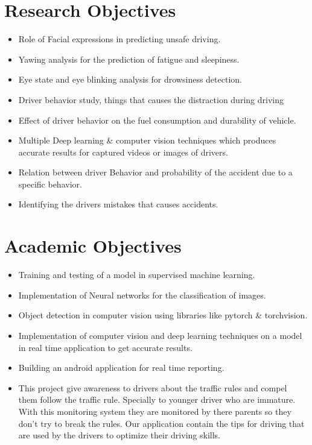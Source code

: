 \section{Research Objectives}
\begin{itemize}
    \item Role of Facial expressions in predicting unsafe driving.
    \item Yawing analysis for the prediction of fatigue and sleepiness.
    \item Eye state and eye blinking analysis for drowsiness detection.
    \item Driver behavior study, things that causes the distraction during driving
    \item Effect of driver behavior on the fuel consumption and durability of vehicle.
    \item Multiple Deep learning \& computer vision techniques which produces accurate results for captured videos or images of drivers.
    \item Relation between driver Behavior and probability of the accident due to a specific behavior.
    \item Identifying the drivers mistakes that causes accidents.
\end{itemize}
\section{Academic Objectives}
\begin{itemize}
    \item Training and testing of a model in supervised machine learning.
    \item Implementation of Neural networks for the classification of images.
    \item Object detection in computer vision using libraries like pytorch \& torchvision.
    \item Implementation of computer vision and deep learning techniques on a model in real time
application to get accurate results.
\item Building an android application for real time reporting.
\item This project give awareness to drivers about the traffic rules and compel them follow the traffic
rule. Specially to younger driver who are immature. With this monitoring system they are
monitored by there parents so they don’t try to break the rules. Our application contain the tips
for driving that are used by the drivers to optimize their driving skills.
\end{itemize}

